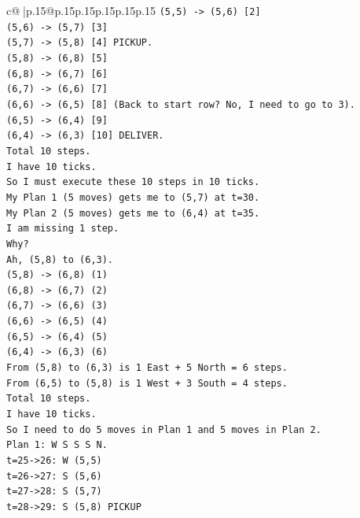 \documentclass{article}
\begin{document}
{\begin{supertabular}{c@{$\;$}|p{.15\linewidth}@{}p{.15\linewidth}p{.15\linewidth}p{.15\linewidth}p{.15\linewidth}p{.15\linewidth}}
{{{\texttt{(5,5) {-}> (5,6) {[}2{]}} \\
\texttt{(5,6) {-}> (5,7) {[}3{]}} \\
\texttt{(5,7) {-}> (5,8) {[}4{]} PICKUP.} \\
\texttt{(5,8) {-}> (6,8) {[}5{]}} \\
\texttt{(6,8) {-}> (6,7) {[}6{]}} \\
\texttt{(6,7) {-}> (6,6) {[}7{]}} \\
\texttt{(6,6) {-}> (6,5) {[}8{]} (Back to start row? No, I need to go to 3).} \\
\texttt{(6,5) {-}> (6,4) {[}9{]}} \\
\texttt{(6,4) {-}> (6,3) {[}10{]} DELIVER.} \\
\texttt{Total 10 steps.} \\
\texttt{I have 10 ticks.} \\
\texttt{So I must execute these 10 steps in 10 ticks.} \\
\texttt{My Plan 1 (5 moves) gets me to (5,7) at t=30.} \\
\texttt{My Plan 2 (5 moves) gets me to (6,4) at t=35.} \\
\texttt{I am missing 1 step.} \\
\texttt{Why?} \\
\texttt{Ah, (5,8) to (6,3).} \\
\texttt{(5,8) {-}> (6,8) (1)} \\
\texttt{(6,8) {-}> (6,7) (2)} \\
\texttt{(6,7) {-}> (6,6) (3)} \\
\texttt{(6,6) {-}> (6,5) (4)} \\
\texttt{(6,5) {-}> (6,4) (5)} \\
\texttt{(6,4) {-}> (6,3) (6)} \\
\texttt{From (5,8) to (6,3) is 1 East + 5 North = 6 steps.} \\
\texttt{From (6,5) to (5,8) is 1 West + 3 South = 4 steps.} \\
\texttt{Total 10 steps.} \\
\texttt{I have 10 ticks.} \\
\texttt{So I need to do 5 moves in Plan 1 and 5 moves in Plan 2.} \\
\texttt{Plan 1: W S S S N.} \\
\texttt{t=25{-}>26: W (5,5)} \\
\texttt{t=26{-}>27: S (5,6)} \\
\texttt{t=27{-}>28: S (5,7)} \\
\texttt{t=28{-}>29: S (5,8) PICKUP} \\
}}}
\end{supertabular}}
\end{document}

